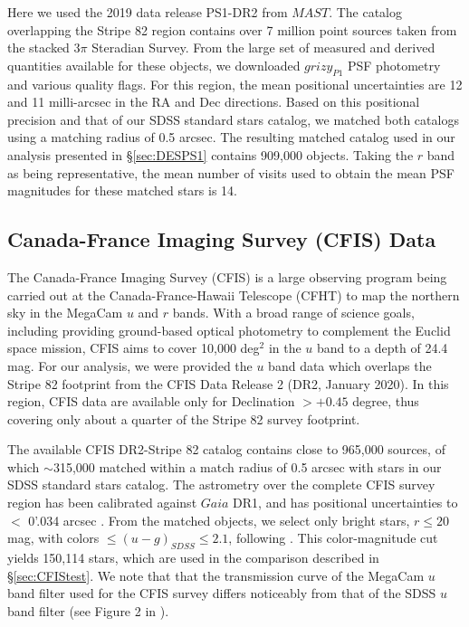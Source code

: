 \documentclass{aastex63}
\begin{document}
Here we used the 2019 data release PS1-DR2 from $MAST$. The catalog overlapping the Stripe 82 region contains 
over 7 million point sources taken from the stacked 3$\pi$ Steradian Survey. From the large set of measured and 
derived quantities available for these objects, we downloaded $grizy_{P1}$ PSF photometry and various quality flags. 
For this region, the mean positional uncertainties are 12 and 11 milli-arcsec in the RA and Dec directions. Based 
on this positional precision and that of our SDSS standard stars catalog, we matched both catalogs using a matching 
radius of 0.5 arcsec. The resulting matched catalog used in our analysis presented in \S \ref{sec:DESPS1} contains 
909,000 objects. Taking the $r$ band as being representative, the mean number of visits used to obtain the mean 
PSF magnitudes for these matched stars is 14. 
        

\subsection{Canada-France Imaging Survey (CFIS) Data} \label{ssec:cfis}

The Canada-France Imaging Survey (CFIS) is a large observing program being carried out at the Canada-France-Hawaii 
Telescope (CFHT) to map the northern sky in the MegaCam $u$ and $r$ bands. With a broad range of science goals, 
including providing ground-based optical photometry to complement the Euclid space mission, CFIS aims to cover 
10,000 deg$^2$ in the $u$ band to a depth of 24.4 mag. For our analysis, we were provided the $u$ band data which 
overlaps the Stripe 82 footprint from the CFIS Data Release 2 (DR2, January 2020). In this region, CFIS data are available
only for Declination $>+0.45$ degree, thus covering only about a quarter of the Stripe 82 survey footprint. 

The available CFIS DR2-Stripe 82 catalog contains close to 965,000 sources, of which $\sim$315,000 matched within 
a match radius of 0.5 arcsec with stars in our SDSS standard stars catalog. The astrometry over the complete CFIS survey 
region has been calibrated against $Gaia$ DR1, and has positional uncertainties to $<$ 0'.034 arcsec 
\citep{2017ApJ...848..128I}.  From the matched objects, we select only bright stars, $r \leq 20$ mag,  with colors  
$\leq (u-g)_{SDSS} \leq 2.1$, following \cite{2017ApJ...848..128I}. This color-magnitude cut yields 150,114 stars, which 
are used in the comparison described in \S \ref{sec:CFIStest}.  We note that that the transmission curve of the MegaCam 
$u$ band filter used for the CFIS survey differs noticeably from that of the SDSS $u$ band filter (see Figure 2 in \citealt{2017ApJ...848..128I}).  
   
\end{document}
